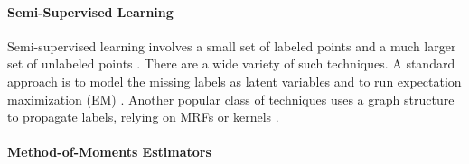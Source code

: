 \paragraph{Semi-Supervised Learning}
Semi-supervised learning involves a small set of labeled points and a much larger set of unlabeled points \cite{Chapelle09, zhu2009introduction}. There are a wide variety of such techniques. A standard approach is to model the missing labels as latent variables and to run expectation maximization (EM) \cite{Nigam2000}. Another popular class of techniques uses a graph structure to propagate labels, relying on MRFs \cite{Zhu02} or kernels \cite{Kondor02}.

\paragraph{Method-of-Moments Estimators}

